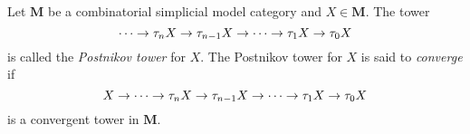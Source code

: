 \begin{definition}
  Let \(\mathbf M\) be a combinatorial simplicial model category and \(X\in\mathbf M\). The tower
  \[\cdots\to\tau_{n} X\to\tau_{n-1} X\to\cdots\to\tau_{1} X\to\tau_{0}X\]
  is called the \emph{Postnikov tower} for \(X\). The Postnikov tower for \(X\) is said to \emph{converge} if
  \[X\to\cdots\to\tau_{n} X\to\tau_{n-1} X\to\cdots\to\tau_{1} X\to\tau_{0}X\]
  is a convergent tower in \(\mathbf M\).
\end{definition}

\printbibliography

\listoftodos
